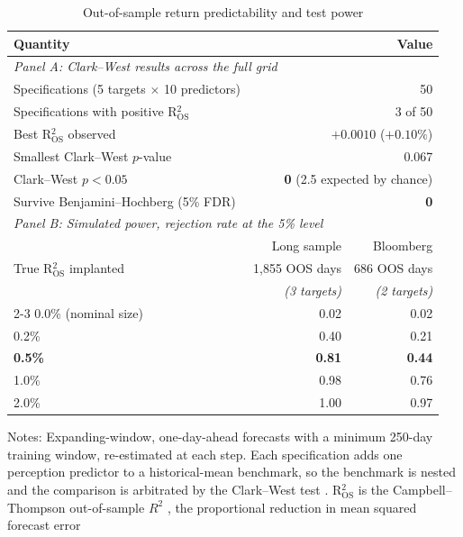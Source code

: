 \documentclass[12pt,a4paper]{article}
\newcommand{\compact}{\setlength{\tabcolsep}{3.5pt}\small}
\begin{document}
\begin{table}[htbp]
\centering
\caption{Out-of-sample return predictability and test power}
\label{tab:efficiency_power}
\begin{threeparttable}
\compact
\begin{tabular}{lrr}
\toprule
Quantity & \multicolumn{2}{r}{Value} \\
\midrule
\multicolumn{3}{l}{\textit{Panel A: Clark--West results across the full grid}} \\
\addlinespace
Specifications (5 targets $\times$ 10 predictors) & \multicolumn{2}{r}{50} \\
Specifications with positive R$^2_{\text{OS}}$ & \multicolumn{2}{r}{3 of 50} \\
Best R$^2_{\text{OS}}$ observed & \multicolumn{2}{r}{$+0.0010$ \quad ($+0.10\%$)} \\
Smallest Clark--West $p$-value & \multicolumn{2}{r}{0.067} \\
Clark--West $p < 0.05$ & \multicolumn{2}{r}{\textbf{0} \quad (2.5 expected by chance)} \\
Survive Benjamini--Hochberg (5\% FDR) & \multicolumn{2}{r}{\textbf{0}} \\
\midrule
\multicolumn{3}{l}{\textit{Panel B: Simulated power, rejection rate at the 5\% level}} \\
\addlinespace
 & Long sample & Bloomberg \\
True R$^2_{\text{OS}}$ implanted & 1,855 OOS days & 686 OOS days \\
 & \textit{(3 targets)} & \textit{(2 targets)} \\
\cmidrule(lr){2-3}
0.0\% (nominal size) & 0.02 & 0.02 \\
0.2\% & 0.40 & 0.21 \\
\textbf{0.5\%} & \textbf{0.81} & \textbf{0.44} \\
1.0\% & 0.98 & 0.76 \\
2.0\% & 1.00 & 0.97 \\
\bottomrule
\end{tabular}
\begin{tablenotes}
\footnotesize
\item Notes: Expanding-window, one-day-ahead forecasts with a minimum 250-day
training window, re-estimated at each step. Each specification adds one
perception predictor to a historical-mean benchmark, so the benchmark is nested
and the comparison is arbitrated by the Clark--West test \citep{clark2007}.
R$^2_{\text{OS}}$ is the Campbell--Thompson out-of-sample $R^2$
\citep{campbell2008}, the proportional reduction in mean squared forecast error

\end{tablenotes}
\end{threeparttable}
\end{table}
\end{document}
